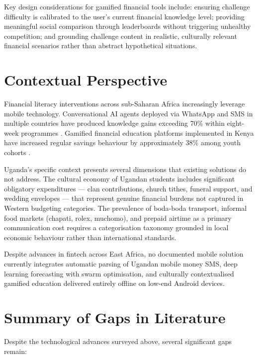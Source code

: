 \documentclass[12pt,a4paper]{report}
\begin{document}
Key design considerations for gamified financial tools include: ensuring challenge
difficulty is calibrated to the user's current financial knowledge level; providing
meaningful social comparison through leaderboards without triggering unhealthy
competition; and grounding challenge content in realistic, culturally relevant financial
scenarios rather than abstract hypothetical situations.

\section{Contextual Perspective}

Financial literacy interventions across sub-Saharan Africa increasingly leverage mobile
technology. Conversational AI agents deployed via WhatsApp and SMS in multiple
countries have produced knowledge gains exceeding 70\% within eight-week programmes
\citep{Mursi2024}. Gamified financial education platforms implemented in Kenya have
increased regular savings behaviour by approximately 38\% among youth cohorts
\citep{AmanaAndTamunomiegbam2024}.

Uganda's specific context presents several dimensions that existing solutions do not
address. The cultural economy of Ugandan students includes significant obligatory
expenditures --- clan contributions, church tithes, funeral support, and wedding
envelopes --- that represent genuine financial burdens not captured in Western
budgeting categories. The prevalence of boda-boda transport, informal food markets
(chapati, rolex, muchomo), and prepaid airtime as a primary communication cost
requires a categorisation taxonomy grounded in local economic behaviour rather than
international standards.

Despite advances in fintech across East Africa, no documented mobile solution
currently integrates automatic parsing of Ugandan mobile money SMS, deep learning
forecasting with swarm optimisation, and culturally contextualised gamified education
delivered entirely offline on low-end Android devices.

\section{Summary of Gaps in Literature}

Despite the technological advances surveyed above, several significant gaps remain:
\end{document}
